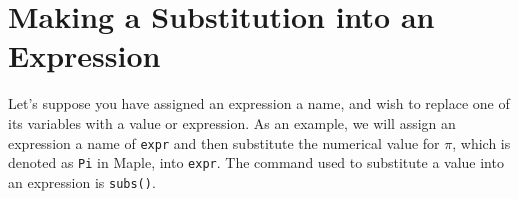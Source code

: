 \begin{maplegroup}
\begin{mapleinput}
\end{mapleinput}
\mapleresult
\begin{maplelatex}
\end{maplelatex}
\end{maplegroup}

\begin{maplegroup}
\begin{mapleinput}
\end{mapleinput}
\mapleresult
\begin{maplelatex}
\end{maplelatex}
\end{maplegroup}

\begin{maplegroup}
\begin{mapleinput}
\end{mapleinput}
\mapleresult
\begin{maplelatex}
\end{maplelatex}
\end{maplegroup}

\section{Making a Substitution into an Expression}
\label{sec:making_substitutions}

Let's suppose you have assigned an expression a name, and wish to replace one of its variables with a value or expression. As an example, we will assign an expression a name of \texttt{expr} and then substitute the numerical value for $\pi$, which is denoted as \texttt{Pi} in Maple, into \texttt{expr}. The command used to substitute a value into an expression is \texttt{subs()}.

